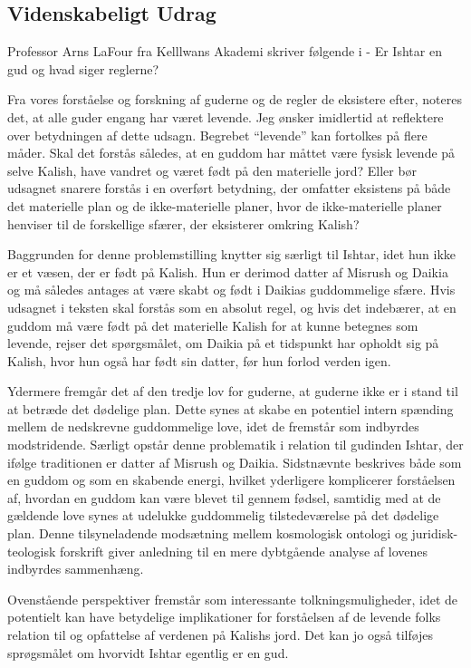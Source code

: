 \documentclass[letterpaper,12pt]{memoir}
\begin{document}
\subsection*{Videnskabeligt Udrag}
Professor Arns LaFour fra Kelllwans Akademi skriver følgende i - Er Ishtar en gud og hvad siger reglerne?

Fra vores forståelse og forskning af guderne og de regler de eksistere efter, noteres det, at alle guder engang har været levende. Jeg ønsker imidlertid at reflektere over betydningen af dette udsagn. Begrebet “levende” kan fortolkes på flere måder. Skal det forstås således, at en guddom har måttet være fysisk levende på selve Kalish, have vandret og været født på den materielle jord? Eller bør udsagnet snarere forstås i en overført betydning, der omfatter eksistens på både det materielle plan og de ikke-materielle planer, hvor de ikke-materielle planer henviser til de forskellige sfærer, der eksisterer omkring Kalish?

Baggrunden for denne problemstilling knytter sig særligt til Ishtar, idet hun ikke er et væsen, der er født på Kalish. Hun er derimod datter af Misrush og Daikia og må således antages at være skabt og født i Daikias guddommelige sfære. Hvis udsagnet i teksten skal forstås som en absolut regel, og hvis det indebærer, at en guddom må være født på det materielle Kalish for at kunne betegnes som levende, rejser det spørgsmålet, om Daikia på et tidspunkt har opholdt sig på Kalish, hvor hun også har født sin datter, før hun forlod verden igen.

Ydermere fremgår det af den tredje lov for guderne, at guderne ikke er i stand til at betræde det dødelige plan. Dette synes at skabe en potentiel intern spænding mellem de nedskrevne guddommelige love, idet de fremstår som indbyrdes modstridende. Særligt opstår denne problematik i relation til gudinden Ishtar, der ifølge traditionen er datter af Misrush og Daikia. Sidstnævnte beskrives både som en guddom og som en skabende energi, hvilket yderligere komplicerer forståelsen af, hvordan en guddom kan være blevet til gennem fødsel, samtidig med at de gældende love synes at udelukke guddommelig tilstedeværelse på det dødelige plan. Denne tilsyneladende modsætning mellem kosmologisk ontologi og juridisk-teologisk forskrift giver anledning til en mere dybtgående analyse af lovenes indbyrdes sammenhæng.

Ovenstående perspektiver fremstår som interessante tolkningsmuligheder, idet de potentielt kan have betydelige implikationer for forståelsen af de levende folks relation til og opfattelse af verdenen på Kalishs jord.  Det kan jo også tilføjes sprøgsmålet om hvorvidt Ishtar egentlig er en gud.
\end{document}

